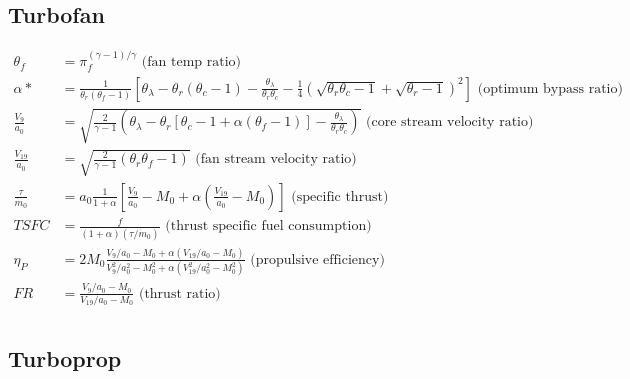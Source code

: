 \documentclass[]{aiaa-tc}%
\begin{document}
\subsection{Turbofan}

\begin{align*}
	\theta_{f} &= \pi_{f}^{(\gamma-1)/\gamma} \text{ (fan temp ratio)}\\
	\alpha* &= \frac{1}{\theta_{r}(\theta_{f}-1)}\left[\theta_{\lambda}-\theta_{r}(\theta_{c}-1)
		- \frac{\theta_{\lambda}}{\theta_{r}\theta_{c}} - \frac{1}{4}(\sqrt{\theta_{r}\theta_{c}
		- 1} + \sqrt{\theta_{r}-1})^{2}\right] \text{ (optimum bypass ratio)}\\
	\frac{V_{9}}{a_{0}} &= \sqrt{\frac{2}{\gamma-1}\left(\theta_{\lambda}-\theta_{r}[\theta_{c}
		-1+\alpha(\theta_{f}-1)]-\frac{\theta_{\lambda}}{\theta_{r}\theta_{c}} \right) }
		\text{ (core stream velocity ratio)}\\
	\frac{V_{19}}{a_{0}} &= \sqrt{\frac{2}{\gamma-1}(\theta_{r}\theta_{f}-1)}
		\text{ (fan stream velocity ratio)}\\
	\frac{\tau}{\dot{m}_{0}} &= a_{0}\frac{1}{1+\alpha}\left[\frac{V_{9}}{a_{0}}-M_{0}
		+ \alpha(\frac{V_{19}}{a_{0}}-M_{0}) \right] \text{ (specific thrust)}\\
	TSFC &= \frac{f}{(1+\alpha)(\tau/\dot{m}_{0})} \text{ (thrust specific fuel consumption)}\\
	\eta_{P} &= 2M_{0}\frac{V_{9}/a_{0}-M_{0}+\alpha(V_{19}/a_{0}-M_{0})}
		{V_{9}^{2}/a_{0}^{2}-M_{0}^{2}+\alpha(V_{19}^{2}/a_{0}^{2}-M_{0}^{2})}
		\text{ (propulsive efficiency)}\\	
	FR &= \frac{V_{9}/a_{0}-M_{0}}{V_{19}/a_{0}-M_{0}} \text{ (thrust ratio)}\\
\end{align*}

\subsection{Turboprop}
\end{document}
